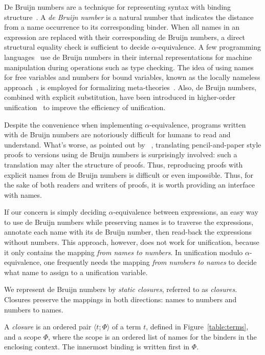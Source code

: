 \documentclass[a4paper,UKenglish]{lipics-v2016}
\newcommand{\clos}[2] {
  \langle #1; #2 \rangle
}
\begin{document}
De Bruijn numbers are a technique for representing syntax with binding
structure~\citep{de_bruijn_lambda_1972}.  A \emph{de Bruijn number} is
a natural number that indicates the distance from a name occurrence to
its corresponding binder.  When all names in an expression are
replaced with their corresponding de Bruijn numbers, a direct
structural equality check is sufficient to decide
$\alpha$-equivalence.  A few programming
languages~\citep{norell_towards_2007} use de Bruijn numbers in their
internal representations for machine manipulation during operations
such as type checking.  The idea of using names for free variables and
numbers for bound variables, known as the locally nameless
approach~\citep{chargueraud_locally_2012}, is employed for formalizing
meta-theories~\citep{aydemir_nominal_2006,
  aydemir_engineering_2008}.  Also, de Bruijn numbers, combined with
explicit substitution, have been introduced in higher-order
unification~\citep{dowek_higher_2000} to improve the efficiency of
unification.

Despite the convenience when implementing $\alpha$-equivalence,
programs written with de Bruijn numbers are notoriously difficult for
humans to read and understand.  What's worse, as pointed out by
~\citet{berghofer_head--head_2007}, translating
pencil-and-paper style proofs to versions using de Bruijn numbers is
surprisingly involved: such a translation may alter the structure of
proofs. Thus, reproducing proofs with explicit names from de
Bruijn numbers is difficult or even impossible.  Thus, for the sake of
both readers and writers of proofs, it is worth providing an interface
with names.

If our concern is simply deciding $\alpha$-equivalence between
expressions, an easy way to use de Bruijn numbers while preserving
names is to traverse the expressions, annotate each name with its de
Bruijn number, then read-back the expressions without numbers.  This
approach, however, does not work for unification, because it only
contains the mapping \emph{from names to numbers}.  In unification
modulo $\alpha$-equivalence, one frequently needs the mapping
\emph{from numbers to names} to decide what name to assign to a
unification variable.

We represent de Bruijn numbers by \emph{static closures},
referred to as \emph{closures}.  Closures preserve the
mappings in both directions: names to numbers and numbers to names.

\begin{definition}
  A \emph{closure} is an ordered pair $\clos{t}{\Phi}$ of a term $t$,
  defined in Figure~\ref{table:terms}, and a scope $\Phi$, where the
  scope is an ordered list of names for the binders in the enclosing
  context. The innermost binding is written first in $\Phi$.
\end{definition}
\end{document}
